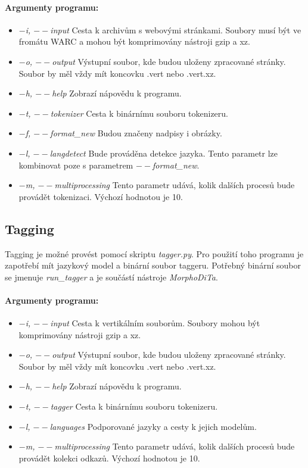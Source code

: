 \paragraph{Argumenty programu: }
\begin{itemize}
    \item \textit{$-$i, $--$input} Cesta k archivům s webovými stránkami. Soubory musí být ve fromátu WARC a mohou být komprimovány nástroji gzip a xz.
    \item \textit{$-$o, $--$output} Výstupní soubor, kde budou uloženy zpracované stránky. Soubor by měl vždy mít koncovku .vert nebo .vert.xz.
    \item \textit{$-$h, $--$help} Zobrazí nápovědu k programu.
    \item \textit{$-$t, $--$tokenizer} Cesta k binárnímu souboru tokenizeru.
    \item \textit{$-$f, $--$format\_new} Budou značeny nadpisy i obrázky.
    \item \textit{$-$l, $--$langdetect} Bude prováděna detekce jazyka. Tento parametr lze kombinovat poze s parametrem \textit{$--$format\_new}.
    \item \textit{$-$m, $--$multiprocessing} Tento parametr udává, kolik dalších procesů bude provádět tokenizaci. Výchozí hodnotou je 10.
\end{itemize}

\subsection{Tagging}
Tagging je možné provést pomocí skriptu \textit{tagger.py}. Pro použití toho programu je zapotřebí
mít jazykový model a binární soubor taggeru. Potřebný binární soubor se jmenuje \textit{run\_tagger}
a je součástí nástroje \textit{MorphoDiTa}.

\paragraph{Argumenty programu: }
\begin{itemize}
    \item \textit{$-$i, $--$input} Cesta k vertikálním souborům. Soubory mohou být komprimovány nástroji gzip a xz.
    \item \textit{$-$o, $--$output} Výstupní soubor, kde budou uloženy zpracované stránky. Soubor by měl vždy mít koncovku .vert nebo .vert.xz.
    \item \textit{$-$h, $--$help} Zobrazí nápovědu k programu.
    \item \textit{$-$t, $--$tagger} Cesta k binárnímu souboru tokenizeru.
    \item \textit{$-$l, $--$languages} Podporované jazyky a cesty k jejich modelům.
    \item \textit{$-$m, $--$multiprocessing} Tento parametr udává, kolik dalších procesů bude provádět kolekci odkazů. Výchozí hodnotou je 10.
\end{itemize}

